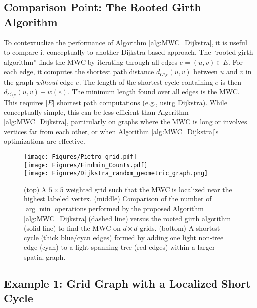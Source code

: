 \documentclass{article}
\begin{document}
\subsection{Comparison Point: The Rooted Girth Algorithm}
\label{subsec:rooted_girth}

To contextualize the performance of Algorithm \ref{alg:MWC_Dijkstra}, it is useful to compare it conceptually to another Dijkstra-based approach. The ``rooted girth algorithm'' finds the MWC by iterating through all edges $e = (u,v) \in E$. For each edge, it computes the shortest path distance $d_{G\setminus e}(u,v)$ between $u$ and $v$ in the graph \textit{without} edge $e$. The length of the shortest cycle containing $e$ is then $d_{G\setminus e}(u,v) + w(e)$. The minimum length found over all edges is the MWC. This requires $|E|$ shortest path computations (e.g., using Dijkstra). While conceptually simple, this can be less efficient than Algorithm \ref{alg:MWC_Dijkstra}, particularly on graphs where the MWC is long or involves vertices far from each other, or when Algorithm \ref{alg:MWC_Dijkstra}'s optimizations are effective.


\begin{wrapfigure}[35]{r}{0.35\textwidth}
\vspace{-15pt}
	\centering
	\texttt{[image: Figures/Pietro\_grid.pdf]} \\
	\texttt{[image: Figures/Findmin\_Counts.pdf]}\\
    \texttt{[image: Figures/Dijkstra\_random\_geometric\_graph.png]}
	\caption{(top) A $5\times 5$ weighted grid such that the MWC is localized near the highest labeled vertex. (middle) Comparison of the number of $\arg\min$ operations performed by the proposed Algorithm \ref{alg:MWC_Dijkstra} (dashed line) versus the rooted girth algorithm (solid line) to find the MWC on $d \times d$ grids. (bottom) A shortest cycle (thick blue/cyan edges) formed by adding one light non-tree edge (cyan) to a light spanning tree (red edges) within a larger spatial graph.}
    \label{fig:grid}
\end{wrapfigure}

\subsection{Example 1: Grid Graph with a Localized Short Cycle}
\label{subsec:example_grid}
\end{document}
